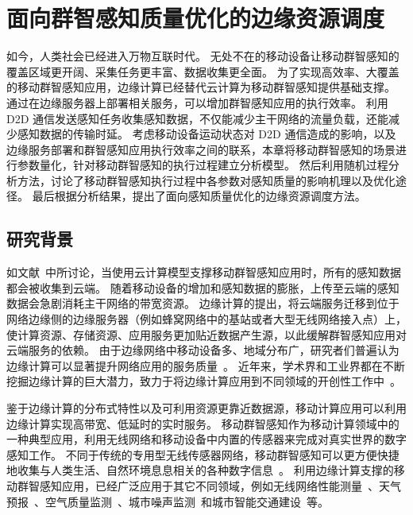 

\chapter{面向群智感知质量优化的边缘资源调度}

如今，人类社会已经进入万物互联时代。
无处不在的移动设备让移动群智感知的覆盖区域更开阔、采集任务更丰富、数据收集更全面。
为了实现高效率、大覆盖的移动群智感知应用，边缘计算已经替代云计算为移动群智感知提供基础支撑。
通过在边缘服务器上部署相关服务，可以增加群智感知应用的执行效率。
利用 D2D 通信发送感知任务收集感知数据，不仅能减少主干网络的流量负载，还能减少感知数据的传输时延。
考虑移动设备运动状态对 D2D 通信造成的影响，以及边缘服务部署和群智感知应用执行效率之间的联系，本章将移动群智感知的场景进行参数量化，针对移动群智感知的执行过程建立分析模型。
然后利用随机过程分析方法，讨论了移动群智感知执行过程中各参数对感知质量的影响机理以及优化途径。
最后根据分析结果，提出了面向感知质量优化的边缘资源调度方法。

\section{研究背景}

如文献~\cite{DBLP:journals/fgcs/AntonicMPZ16,DBLP:conf/ccnc/MessaoudRG16}中所讨论，当使用云计算模型支撑移动群智感知应用时，所有的感知数据都会被收集到云端。
随着移动设备的增加和感知数据的膨胀，上传至云端的感知数据会急剧消耗主干网络的带宽资源。
边缘计算的提出，将云端服务迁移到位于网络边缘侧的边缘服务器（例如蜂窝网络中的基站或者大型无线网络接入点）上，使计算资源、存储资源、应用服务更加贴近数据产生源，以此缓解群智感知应用对云端服务的依赖。
由于边缘网络中移动设备多、地域分布广，研究者们普遍认为边缘计算可以显著提升网络应用的服务质量~\cite{DBLP:conf/sigcomm/BonomiMZA12}。
近年来，学术界和工业界都在不断挖掘边缘计算的巨大潜力，致力于将边缘计算应用到不同领域的开创性工作中~\cite{DBLP:journals/access/MarjanovicAZ18,DBLP:journals/iotj/ChiangZ16}。


鉴于边缘计算的分布式特性以及可利用资源更靠近数据源，移动计算应用可以利用边缘计算实现高带宽、低延时的实时服务。
移动群智感知作为移动计算领域中的一种典型应用，利用无线网络和移动设备中内置的传感器来完成对真实世界的数字感知工作。
不同于传统的专用型无线传感器网络，移动群智感知可以更方便快捷地收集与人类生活、自然环境息息相关的各种数字信息~\cite{DBLP:journals/cm/GuoCZYC16}。
利用边缘计算支撑的移动群智感知应用，已经广泛应用于其它不同领域，例如无线网络性能测量~\cite{DBLP:journals/cm/RosenLLCMB14}、天气预报~\cite{DBLP:journals/tpds/ZhaoMTL15}、空气质量监测~\cite{DBLP:conf/huc/ZhangXWC14}、城市噪声监测~\cite{DBLP:conf/huc/ZhengLWZLC14}和城市智能交通建设~\cite{DBLP:conf/icdcs/ZhouJL15}等。

